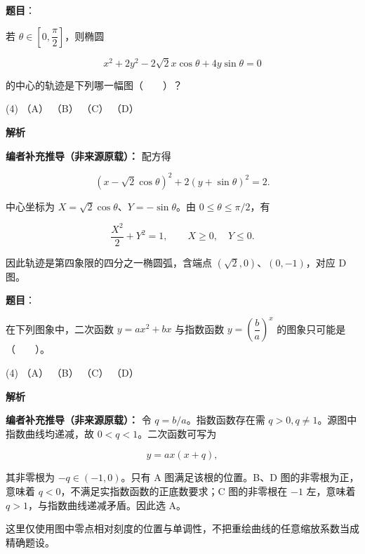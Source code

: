 \begin{answer}

\textbf{题目}：

若 $\theta\in\left[0,\dfrac{\pi}{2}\right]$，则椭圆

\nopagebreak[4]
\[
x^2+2y^2-2\sqrt2x\cos\theta+4y\sin\theta=0
\]

的中心的轨迹是下列哪一幅图\mbox{（　　）}？
\nopagebreak[4]
\begin{center}\end{center}
\nopagebreak[4]
\begin{gkopts}(4)
\task （A）
\task （B）
\task （C）
\task （D）
\end{gkopts}

\textbf{解析}

\textbf{编者补充推导（非来源原载）：} 配方得

\nopagebreak[4]
\[(x-\sqrt2\cos\theta)^2+2(y+\sin\theta)^2=2.\]

中心坐标为 $X=\sqrt2\cos\theta$、$Y=-\sin\theta$。由 $0\le\theta\le\pi/2$，有

\nopagebreak[4]
\[\frac{X^2}{2}+Y^2=1,\qquad X\ge0,\quad Y\le0.\]

因此轨迹是第四象限的四分之一椭圆弧，含端点 $(\sqrt2,0)$、$(0,-1)$，对应 D 图。


\end{answer}
\begin{answer}

\textbf{题目}：

在下列图象中，二次函数 $y=ax^2+bx$ 与指数函数 $y=\left(\dfrac{b}{a}\right)^x$ 的图象只可能是\mbox{（　　）}。
\nopagebreak[4]
\begin{center}\end{center}
\nopagebreak[4]
\begin{gkopts}(4)
\task （A）
\task （B）
\task （C）
\task （D）
\end{gkopts}

\textbf{解析}

\textbf{编者补充推导（非来源原载）：} 令 $q=b/a$。指数函数存在需 $q>0,q\ne1$。源图中指数曲线均递减，故 $0<q<1$。二次函数可写为

\nopagebreak[4]
\[y=ax(x+q),\]

其非零根为 $-q\in(-1,0)$。只有 A 图满足该根的位置。B、D 图的非零根为正，意味着 $q<0$，不满足实指数函数的正底数要求；C 图的非零根在 $-1$ 左，意味着 $q>1$，与指数曲线递减矛盾。因此选 A。

这里仅使用图中零点相对刻度的位置与单调性，不把重绘曲线的任意缩放系数当成精确题设。


\end{answer}

